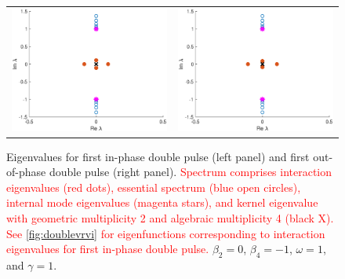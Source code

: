 \documentclass[12pt]{elsarticle}
\newcommand{\revised}[1]{ \textcolor{red}{#1} }
\begin{document}
\begin{figure}[H]
\centering
\begin{tabular}{cc}
\includegraphics[width=8cm]{images/DP1specpp.eps} &
\includegraphics[width=8cm]{images/DP1specmp.eps}
\end{tabular}
\caption{Eigenvalues for first in-phase double pulse (left panel) and first out-of-phase double pulse (right panel). \revised{Spectrum comprises interaction eigenvalues (red dots), essential spectrum (blue open circles), internal mode eigenvalues (magenta stars), and kernel eigenvalue with geometric multiplicity 2 and algebraic multiplicity 4 (black X). See \cref{fig:doublevrvi} for eigenfunctions corresponding to interaction eigenvalues for first in-phase double pulse.} $\beta_2 = 0$, $\beta_4 = -1$, $\omega = 1$, and $\gamma = 1$.}
\label{fig:doublespec}
\end{figure} 
\end{document}
